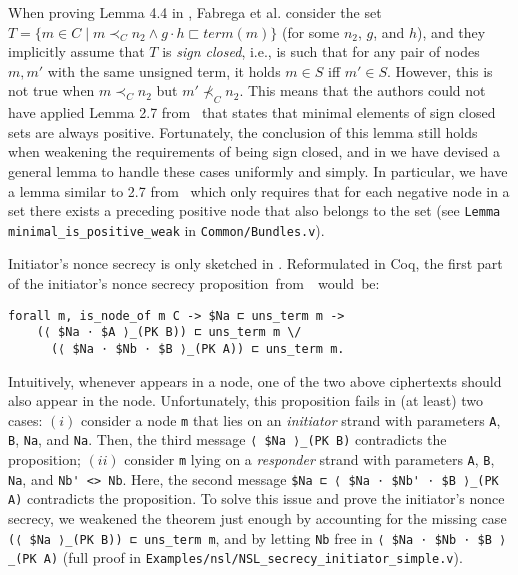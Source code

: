 When proving Lemma 4.4 in \cite{FHG98}, Fabrega et al. consider the set
$T = \{ m \in C \mid m \prec_C n_2 \land g \cdot h \sqsubset \mathit{term} (m) \}$ (for some $n_2$, $g$, and $h$),
and they implicitly assume that $T$ is \emph{sign closed}, i.e., is such that for any pair of nodes $m, m'$ with the same unsigned term, it holds $m \in S$ iff $m' \in S$. However, this is not true when $m \prec_C n_2$ but $m' \not\prec_C n_2$. This means that the authors could not have applied Lemma 2.7 from~\cite{FHG98} that states that minimal elements of sign closed sets are always positive. Fortunately, the conclusion of this lemma still holds when weakening the requirements of being sign closed, and in \easystrands{} we have devised a general lemma to handle these cases uniformly and simply. In particular, we have a lemma similar to 2.7 from~\cite{FHG98} which only requires that for each negative node in a set there exists a preceding positive node that also belongs to the set (see \lstinline|Lemma minimal_is_positive_weak| in \lstinline|Common/Bundles.v|).

Initiator's nonce secrecy is only sketched in \cite{FHG98}.
Reformulated in Coq, the first part of the initiator's nonce secrecy
\mbox{proposition
from~\cite{FHG98} would
be:}
\begin{lstlisting}
forall m, is_node_of m C -> $Na ⊏ uns_term m ->
    (⟨ $Na ⋅ $A ⟩_(PK B)) ⊏ uns_term m \/
      (⟨ $Na ⋅ $Nb ⋅ $B ⟩_(PK A)) ⊏ uns_term m.
\end{lstlisting}
Intuitively, whenever \Na appears in a node, one of the two above ciphertexts should also appear in the node.
Unfortunately, this proposition fails in (at least) two cases:
$(i)$ consider a node \lstinline{m} that lies on an \emph{initiator} strand with parameters \lstinline{A}, \lstinline{B}, \lstinline{Na}, and \lstinline{Na}.
Then, the third message \lstinline{⟨ $Na ⟩_(PK B)} contradicts the proposition;
$(ii)$ consider \lstinline{m} lying on a \emph{responder} strand with parameters \lstinline{A}, \lstinline{B}, \lstinline{Na}, and \lstinline{Nb' <> Nb}.
Here, the second message \lstinline{$Na ⊏ ⟨ $Na ⋅ $Nb' ⋅ $B ⟩_(PK A)} contradicts the proposition.
To solve this issue and prove the initiator's nonce secrecy, we weakened the theorem just enough by accounting for the missing case \lstinline{(⟨ $Na ⟩_(PK B)) ⊏ uns_term m}, and by letting \lstinline|Nb| free in \lstinline|⟨ $Na ⋅ $Nb ⋅ $B ⟩_(PK A)| 
(full proof in \lstinline{Examples/nsl/NSL_secrecy_initiator_simple.v}).

